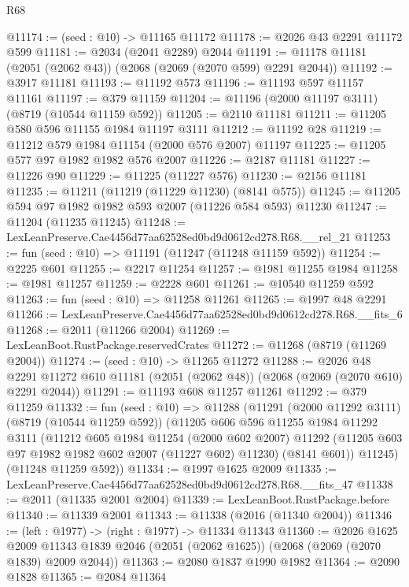 \begin{lexlean}{R68}
\begin{coremodule}
@11174 := (seed : @10) -> @11165 @11172
@11178 := @2026 @43 @2291 @11172 @599
@11181 := @2034 (@2041 @2289) @2044
@11191 := @11178 @11181 (@2051 (@2062 @43)) (@2068 (@2069 (@2070 @599) @2291 @2044))
@11192 := @3917 @11181
@11193 := @11192 @573
@11196 := @11193 @597 @11157 @11161
@11197 := @379 @11159
@11204 := @11196 (@2000 @11197 @3111) (@8719 (@10544 @11159 @592))
@11205 := @2110 @11181
@11211 := @11205 @580 @596 @11155 @1984 @11197 @3111
@11212 := @11192 @28
@11219 := @11212 @579 @1984 @11154 (@2000 @576 @2007) @11197
@11225 := @11205 @577 @97 @1982 @1982 @576 @2007
@11226 := @2187 @11181
@11227 := @11226 @90
@11229 := @11225 (@11227 @576)
@11230 := @2156 @11181
@11235 := @11211 (@11219 (@11229 @11230) (@8141 @575))
@11245 := @11205 @594 @97 @1982 @1982 @593 @2007 (@11226 @584 @593) @11230
@11247 := @11204 (@11235 @11245)
@11248 := LexLeanPreserve.Cae4456d77aa62528ed0bd9d0612cd278.R68.__rel_21
@11253 := fun (seed : @10) => @11191 (@11247 (@11248 @11159 @592))
@11254 := @2225 @601
@11255 := @2217 @11254
@11257 := @1981 @11255 @1984
@11258 := @1981 @11257
@11259 := @2228 @601
@11261 := @10540 @11259 @592
@11263 := fun (seed : @10) => @11258 @11261
@11265 := @1997 @48 @2291
@11266 := LexLeanPreserve.Cae4456d77aa62528ed0bd9d0612cd278.R68.__fits_6
@11268 := @2011 (@11266 @2004)
@11269 := LexLeanBoot.RustPackage.reservedCrates
@11272 := @11268 (@8719 (@11269 @2004))
@11274 := (seed : @10) -> @11265 @11272
@11288 := @2026
    @48
    @2291
    @11272
    @610
    @11181
    (@2051 (@2062 @48))
    (@2068 (@2069 (@2070 @610) @2291 @2044))
@11291 := @11193 @608 @11257 @11261
@11292 := @379 @11259
@11332 := fun (seed : @10) =>
  @11288
    (@11291
      (@2000 @11292 @3111)
      (@8719 (@10544 @11259 @592))
      (@11205
        @606
        @596
        @11255
        @1984
        @11292
        @3111
        (@11212
          @605
          @1984
          @11254
          (@2000 @602 @2007)
          @11292
          (@11205 @603 @97 @1982 @1982 @602 @2007 (@11227 @602) @11230)
          (@8141 @601))
        @11245)
      (@11248 @11259 @592))
@11334 := @1997 @1625 @2009
@11335 := LexLeanPreserve.Cae4456d77aa62528ed0bd9d0612cd278.R68.__fits_47
@11338 := @2011 (@11335 @2001 @2004)
@11339 := LexLeanBoot.RustPackage.before
@11340 := @11339 @2001
@11343 := @11338 (@2016 (@11340 @2004))
@11346 := (left : @1977) -> (right : @1977) -> @11334 @11343
@11360 := @2026
    @1625
    @2009
    @11343
    @1839
    @2046
    (@2051 (@2062 @1625))
    (@2068 (@2069 (@2070 @1839) @2009 @2044))
@11363 := @2080 @1837 @1990 @1982
@11364 := @2090 @1828
@11365 := @2084 @11364

\end{coremodule}
\end{lexlean}
